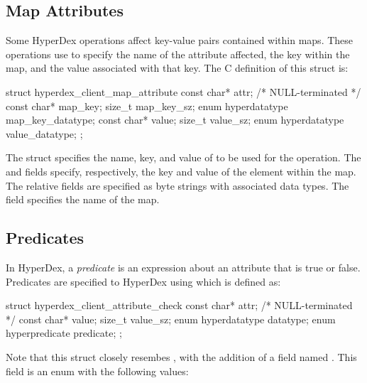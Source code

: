 \subsection{Map Attributes}

Some HyperDex operations affect key-value pairs contained within maps.  These
operations use  to specify the
name of the attribute affected, the key within the map, and the value associated
with that key.  The C definition of this struct is:

\begin{ccode}
struct hyperdex_client_map_attribute
{
    const char* attr; /* NULL-terminated */
    const char* map_key;
    size_t map_key_sz;
    enum hyperdatatype map_key_datatype;
    const char* value;
    size_t value_sz;
    enum hyperdatatype value_datatype;
};
\end{ccode}

The struct specifies the name, key, and value of to be used for the operation.
The  and  fields specify, respectively, the key
and value of the element within the map.  The relative fields are specified as
byte strings with associated data types.  The  field specifies the
name of the map.

\subsection{Predicates}

In HyperDex, a {\em predicate} is an expression about an attribute that is true
or false.  Predicates are specified to HyperDex using  which is defined as:

\begin{ccode}
struct hyperdex_client_attribute_check
{
    const char* attr; /* NULL-terminated */
    const char* value;
    size_t value_sz;
    enum hyperdatatype datatype;
    enum hyperpredicate predicate;
};
\end{ccode}

Note that this struct closely resembes , with the addition of a field named
.  This field is an enum with the following values:

